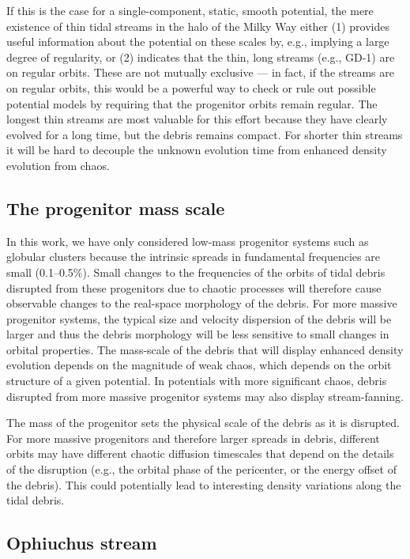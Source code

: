 \documentclass[letterpaper,12pt,preprint]{aastex}
\begin{document}
If this is the case for a single-component, static, smooth potential, the mere existence of thin tidal streams in the halo of the Milky Way either (1) provides useful information about the potential on these scales by, e.g., implying a large degree of regularity, or (2) indicates that the thin, long streams (e.g., GD-1) are on regular orbits. These are not mutually exclusive --- in fact, if the streams are on regular orbits, this would be a powerful way to check or rule out possible potential models by requiring that the progenitor orbits remain regular. The longest thin streams are most valuable for this effort because they have clearly evolved for a long time, but the debris remains compact. For shorter thin streams it will be hard to decouple the unknown evolution time from enhanced density evolution from chaos.

\subsection{The progenitor mass scale}

In this work, we have only considered low-mass progenitor systems such as globular clusters because the intrinsic spreads in fundamental frequencies are small (0.1--0.5\%). Small changes to the frequencies of the orbits of tidal debris disrupted from these progenitors due to chaotic processes will therefore cause observable changes to the real-space morphology of the debris. For more massive progenitor systems, the typical size and velocity dispersion of the debris will be larger and thus the debris morphology will be less sensitive to small changes in orbital properties. The mass-scale of the debris that will display enhanced density evolution depends on the magnitude of weak chaos, which depends on the orbit structure of a given potential. In potentials with more significant chaos, debris disrupted from more massive progenitor systems may also display stream-fanning.

The mass of the progenitor sets the physical scale of the debris as it is disrupted. For more massive progenitors and therefore larger spreads in debris, different orbits may have different chaotic diffusion timescales that depend on the details of the disruption (e.g., the orbital phase of the pericenter, or the energy offset of the debris). This could potentially lead to interesting density variations along the tidal debris.

\subsection{Ophiuchus stream}
\end{document}
